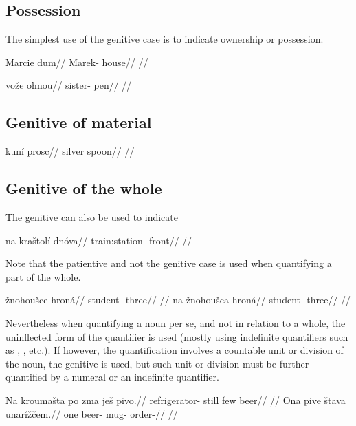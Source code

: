 \subsection{Possession}
The simplest use of the genitive case is to indicate ownership or possession.

\pex
\begingl
\gla Marcie dum//
\glb Marek- house//
\glft {}//
\endgl
\xe

\pex
\begingl
\gla vo\v{z}e ohnou//
\glb sister- pen//
\glft {}//
\endgl
\xe

\subsection{Genitive of material}

\pex
\begingl
\gla kun\'i prosc//
\glb silver spoon//
\glft {}//
\endgl
\xe

\subsection{Genitive of the whole}
The genitive can also be used to indicate

\pex
\begingl
\gla na kra\v{s}tol\'i dn\'ova//
\glb {} train:station- front//
\glft {}//
\endgl
\xe

Note that the patientive and not the genitive case is used when quantifying a part of the whole.

\pex
\a
\begingl
\gla *\v{z}nohou\v{s}ce hron\'a//
\glb student- three//
\glft {}//
\endgl
\a
\begingl
\gla na \v{z}nohou\v{s}ca hron\'a//
\glb {} student- three//
\glft {}//
\endgl
\xe

Nevertheless when quantifying a noun per se, and not in relation to a whole, the uninflected form of the quantifier is used (mostly using indefinite quantifiers such as , , etc.). If however, the quantification involves a countable unit or division of the noun, the genitive is used, but such unit or division must be further quantified by a numeral or an indefinite quantifier.

\pex
\a
\begingl
\gla Na krouma\v{s}ta po zma je\v{s} pivo.//
\glb {} refrigerator- still few  beer//
\glft {}//
\endgl
\a
\begingl
\gla Ona pive \v{s}tava unar\'i\v{z}\v{c}em.//
\glb one beer- mug- order-//
\glft {}//
\endgl
\xe

